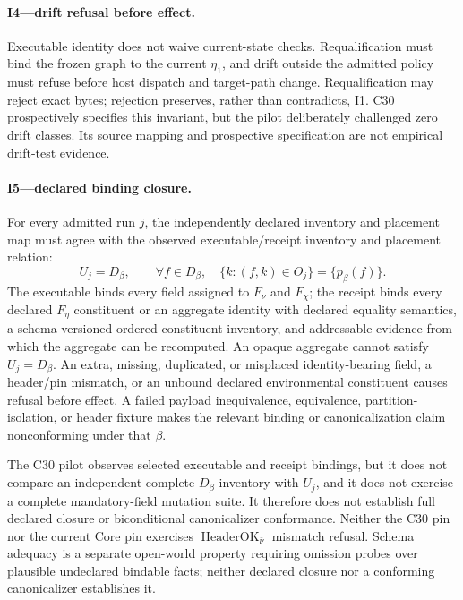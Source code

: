 \documentclass[11pt]{article}
\begin{document}
\paragraph{I4---drift refusal before effect.}
Executable identity does not waive current-state checks.  Requalification must
bind the frozen graph to the current \(\eta_1\), and drift outside the admitted
policy must refuse before host dispatch and target-path change.  Requalification
may reject exact bytes; rejection preserves, rather than contradicts, I1. C30
prospectively specifies this invariant, but the pilot deliberately challenged
zero drift classes. Its source mapping and prospective specification are not
empirical drift-test evidence.

\paragraph{I5---declared binding closure.}
For every admitted run \(j\), the independently declared inventory and
placement map must agree with the observed executable/receipt inventory and
placement relation:
\[
U_j=D_\beta,\qquad
\forall f\in D_\beta,\quad
\{k:(f,k)\in O_j\}=\{p_\beta(f)\}.
\]
The executable binds every field assigned to \(F_\nu\) and \(F_\chi\); the
receipt binds every declared \(F_\eta\) constituent or an aggregate identity
with declared equality semantics, a schema-versioned ordered constituent
inventory, and addressable evidence from which the aggregate can be recomputed.
An opaque aggregate cannot satisfy \(U_j=D_\beta\). An extra,
missing, duplicated, or misplaced identity-bearing field, a header/pin
mismatch, or an unbound declared environmental constituent causes refusal
before effect. A failed payload inequivalence, equivalence,
partition-isolation, or header fixture makes the relevant binding or
canonicalization claim nonconforming under that \(\beta\).

The C30 pilot observes selected executable and receipt bindings, but it does
not compare an independent complete \(D_\beta\) inventory with \(U_j\), and it
does not exercise a complete mandatory-field mutation suite. It therefore does
not establish full declared closure or biconditional canonicalizer
conformance. Neither the C30 pin nor the current Core pin exercises
\(\operatorname{HeaderOK}_{\bar\nu}\) mismatch refusal. Schema adequacy is a
separate open-world property requiring omission probes over plausible
undeclared bindable facts; neither declared closure nor a conforming
canonicalizer establishes it.
\end{document}
